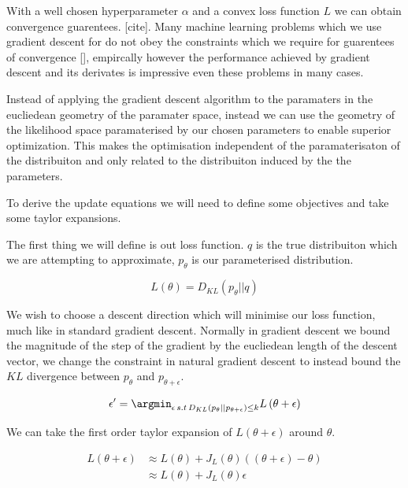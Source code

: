\documentclass[12pt, a4paper]{report}
\theoremstyle{definition}
\begin{document}
With a well chosen hyperparameter $\alpha$ and a convex loss function $L$ we can obtain convergence guarentees. [cite]. Many machine learning problems which we use gradient descent for do not obey the constraints which we require for guarentees of convergence [], empircally however the performance achieved by gradient descent and its derivates is impressive even these problems in many cases.

Instead of applying the gradient descent algorithm to the paramaters in the eucliedean geometry of the paramater space, instead we can use the geometry of the likelihood space paramaterised by our chosen parameters to enable superior optimization. This makes the optimisation independent of the paramaterisaton of the distribuiton and only related to the distribuiton induced by the the parameters.
 
To derive the update equations we will need to define some objectives and take some taylor expansions.

The first thing we will define is out loss function. $q$ is the true distribuiton which we are attempting to approximate, $p_\theta$ is our parameterised distribution.

$$L \left(\theta \right) = D_{KL} \left(p_\theta || q \right) $$

We wish to choose a descent direction which will minimise our loss function, much like in standard gradient descent. Normally in gradient descent we bound the magnitude of the step of the gradient by the eucliedean length of the descent vector, we change the constraint in natural gradient descent to instead bound the $KL$ divergence between $p_\theta$ and $p_{\theta + \epsilon}$.

\begin{align}
    \epsilon^\prime &= \argmin_{\epsilon \, s.t \, D_{KL} \left(p_\theta || p_{\theta + \epsilon} \right) \leq k} L \left( \theta + \epsilon \right) \\
\end{align}

We can take the first order taylor expansion of $L\left(\theta + \epsilon\right)$ around $\theta$.


\begin{align*}
L\left(\theta + \epsilon\right) &\approx L\left( \theta \right) + J_L \left( \theta\right) \left( \left( \theta + \epsilon \right) - \theta \right)  \\
&\approx L\left( \theta \right) +  J_L \left( \theta\right) \epsilon \\
\end{align*}
\end{document}
